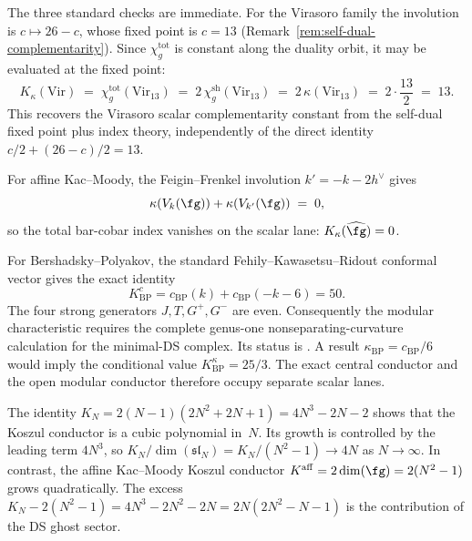 \begin{remark}
The three standard checks are immediate. For the Virasoro family the
involution is $c \mapsto 26-c$, whose fixed point is $c = 13$
\textup{(}Remark~\textup{\ref{rem:self-dual-complementarity}}\textup{)}.
Since $\chi_g^{\mathrm{tot}}$ is constant along the duality orbit, it
may be evaluated at the fixed point:
\[
K_\kappa(\mathrm{Vir})
\;=\;
\chi_g^{\mathrm{tot}}(\mathrm{Vir}_{13})
\;=\;
2\,\chi_g^{\mathrm{sh}}(\mathrm{Vir}_{13})
\;=\;
2\,\kappa(\mathrm{Vir}_{13})
\;=\;
2 \cdot \frac{13}{2}
\;=\;
13.
\]
This recovers the Virasoro scalar complementarity constant from the
self-dual fixed point plus index theory, independently of the direct
identity $c/2 + (26-c)/2 = 13$.

For affine Kac--Moody, the Feigin--Frenkel involution
$k' = -k - 2h^\vee$ gives
\[
\kappa(V_k(\fg)) + \kappa(V_{k'}(\fg)) \;=\; 0,
\]
so the total bar-cobar index vanishes on the scalar lane:
$K_\kappa(\widehat{\fg}) = 0$.

For Bershadsky--Polyakov, the standard
Fehily--Kawasetsu--Ridout conformal vector gives the exact identity
\[
K^c_{\mathrm{BP}}
=c_{\mathrm{BP}}(k)+c_{\mathrm{BP}}(-k-6)=50.
\]
The four strong generators $J,T,G^+,G^-$ are even.  Consequently the
modular characteristic requires the complete genus-one
nonseparating-curvature calculation for the minimal-DS complex.  Its
status is \ClaimStatusOpen.  A result
$\kappa_{\mathrm{BP}}=c_{\mathrm{BP}}/6$ would imply the conditional
value $K^\kappa_{\mathrm{BP}}=25/3$.  The exact central conductor and
the open modular conductor therefore occupy separate scalar lanes.
\end{remark}

\begin{remark}
\label{rem:koszul-conductor-polynomial}
The identity $K_N = 2(N{-}1)(2N^2{+}2N{+}1) = 4N^3 - 2N - 2$
shows that the Koszul conductor is a cubic polynomial in~$N$.
Its growth is controlled by the leading term $4N^3$, so
$K_N/\dim(\mathfrak{sl}_N) = K_N/(N^2-1) \to 4N$ as
$N \to \infty$. In contrast, the affine Kac--Moody Koszul
conductor $K^{\mathrm{aff}} = 2\dim(\fg) = 2(N^2 - 1)$ grows
quadratically. The excess $K_N - 2(N^2 - 1) = 4N^3 - 2N^2 - 2N
= 2N(2N^2 - N - 1)$ is the contribution of the DS ghost sector.
\end{remark}

